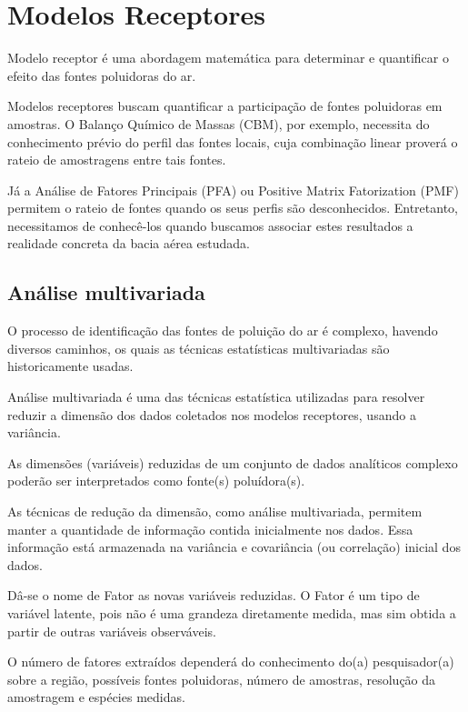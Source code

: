 \section{Modelos Receptores}

Modelo receptor é uma abordagem matemática para determinar e 
quantificar o efeito das fontes poluidoras do ar. 

Modelos receptores buscam quantificar a participação de fontes poluidoras em amostras. 
O Balanço Químico de Massas (CBM), por exemplo, necessita do conhecimento prévio do 
perfil das fontes locais, cuja combinação linear proverá o rateio de amostragens 
entre tais fontes. 

Já a Análise de Fatores Principais (PFA) ou Positive Matrix Fatorization (PMF)
permitem o rateio de fontes quando os seus perfis são desconhecidos. 
Entretanto, necessitamos de conhecê-los quando buscamos associar estes 
resultados a realidade concreta da bacia aérea estudada. 


\subsection{Análise multivariada}

O processo de identificação das fontes de poluição do ar é 
complexo, havendo diversos caminhos, os quais as técnicas estatísticas
multivariadas são historicamente usadas.
 
Análise multivariada é uma das técnicas estatística utilizadas para 
resolver reduzir a dimensão dos dados coletados nos modelos receptores, 
usando a variância. 

As dimensões (variáveis) reduzidas de um conjunto de dados analíticos 
complexo poderão ser interpretados como fonte(s) poluídora(s).

As técnicas de redução da dimensão, como análise multivariada, 
permitem manter a quantidade de informação contida inicialmente nos dados. 
Essa informação está armazenada na variância e covariância (ou correlação) 
inicial dos dados. 

Dâ-se o nome de Fator as novas variáveis reduzidas. 
O Fator é um tipo de variável latente, pois não é uma grandeza diretamente
medida, mas sim obtida a partir de outras variáveis observáveis. 

O número de fatores extraídos dependerá do conhecimento do(a) pesquisador(a)
sobre a região, possíveis fontes poluidoras, número de amostras, 
resolução da amostragem e espécies medidas.

